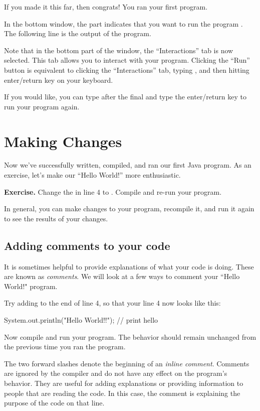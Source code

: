 If you made it this far, then congrats! You ran your first program.

In the bottom window, the  part indicates that you want to run the program . The following line is the output of the program. 

Note that in the bottom part of the window, the ``Interactions'' tab is now
selected. This tab allows you to interact with your program. Clicking
the ``Run'' button is equivalent to clicking the ``Interactions'' tab, typing
, and then hitting enter/return key on your keyboard.

If you would like, you can type  after the final \ic{>} and
type the enter/return key to run your program again.

\section{Making Changes}
Now we've successfully written, compiled, and ran our first Java program.
As an exercise, let's make our ``Hello World!'' more enthusiastic.
\newline

\textbf{Exercise.} Change the  in line 4 to . Compile and re-run your program.
\newline

 In general,
you can make changes to your program, recompile it, and run it again
to see the results of your changes.

\subsection{Adding comments to your code}

It is sometimes helpful to provide explanations of what your code is doing. These are known as \emph{comments}. We will look at a few ways to comment your ``Hello World!" program.

Try adding  to the end of line 4, so that your line 4 now looks like this:
\begin{code}
        System.out.println("Hello World!!"); // print hello
\end{code}

Now compile and run your program. The behavior should remain unchanged from the previous time you ran the program.

The two forward slashes \ic{//} denote the beginning of an \emph{inline comment}. Comments are ignored by the compiler and do not have any effect on
the program's behavior. They are
useful for adding explanations or providing information to people that are reading the code. In this case,
the comment  is explaining the purpose of the code on that line.

